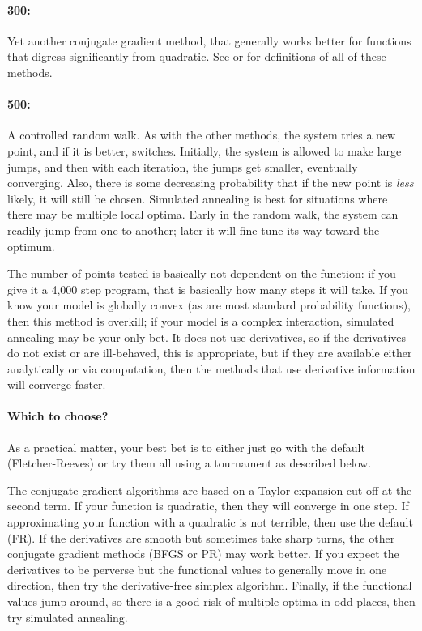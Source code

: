 \paragraph{300: } Yet another
conjugate gradient method, that generally works better for functions
that digress significantly from quadratic.  See \citet[thorough, mathematician audience]{avriel:nonlinear}
or \citet[practical, modeling audience]{practical:optimization}  for definitions of all of these methods.

\paragraph{500: } A controlled random walk.
As with the other methods, the system tries a new point, and if it
is better, switches. Initially, the system is allowed to make large
jumps, and then with each iteration, the jumps get smaller, eventually
converging. Also, there is some decreasing probability that if the new
point is {\em less} likely, it will still be chosen. Simulated annealing
is best for situations where there may be multiple local optima. Early
in the random walk, the system can readily jump from one to another;
later it will fine-tune its way toward the optimum. 

The number of points tested is basically not dependent on the function:
if you give it a 4,000 step program, that is basically how many steps
it will take.  If you know your model is globally convex (as are
most standard probability functions), then this method is overkill; if
your model is a complex interaction, simulated annealing may be your
only bet. It
does not use derivatives, so if the derivatives do not exist or are
ill-behaved, this is appropriate, but if they are available either
analytically or via computation, then the methods that use derivative
information will converge faster.

\paragraph{Which to choose?}
As a practical matter, your best bet is to either just go with the default
(Fletcher-Reeves) or try them all using a tournament as described below.

The conjugate gradient algorithms are based on a Taylor expansion cut
off at the second term. If your function is quadratic, then they will
converge in one step.  
If approximating your function with a quadratic is not terrible, then
use the default (FR). If the derivatives are smooth but sometimes take sharp
turns, the other conjugate gradient methods (BFGS or PR) may work
better. If you expect the derivatives to be perverse but the functional
values to generally move in one direction, then 
try the derivative-free simplex algorithm. Finally, if the functional
values jump around, so there is a good risk of multiple
optima in odd places, then try simulated annealing.

